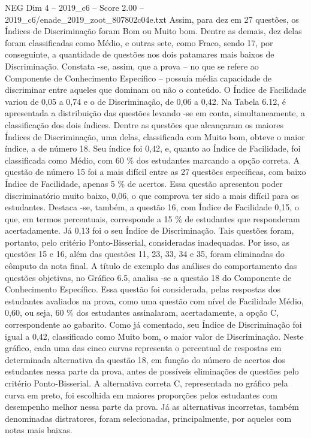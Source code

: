 \begin{textsample}{NEG Dim 4 – 2019\_c6 – Score 2.00 – 2019\_c6/enade\_2019\_zoot\_807802c04e.txt}
Assim, para dez em 27 questões, os Índices de Discriminação foram Bom ou Muito bom.
Dentre as demais, dez delas foram classificadas como Médio, e outras sete, como Fraco, sendo 17, por conseguinte, a quantidade de questões nos dois patamares mais baixos de Discriminação.
Constata -se, assim, que a prova – no que se refere ao Componente de Conhecimento Específico – possuía média capacidade de discriminar entre aqueles que dominam ou não o conteúdo.
O Índice de Facilidade variou de 0,05 a 0,74 e o de Discriminação, de 0,06 a 0,42.
Na Tabela 6.12, é apresentada a distribuição das questões levando -se em conta, simultaneamente, a classificação dos dois índices.
Dentre as questões que alcançaram os maiores Índices de Discriminação, uma delas, classificada com Muito bom, obteve o maior índice, a de número 18.
Seu índice foi 0,42, e, quanto ao Índice de Facilidade, foi classificada como Médio, com 60 \% dos estudantes marcando a opção correta.
A questão de número 15 foi a mais difícil entre as 27 questões específicas, com baixo Índice de Facilidade, apenas 5 \% de acertos.
Essa questão apresentou poder discriminatório muito baixo, 0,06, o que comprova ter sido a mais difícil para os estudantes.
Destaca -se, também, a questão 16, com Índice de Facilidade 0,15, o que, em termos percentuais, corresponde a 15 \% de estudantes que responderam acertadamente.
Já 0,13 foi o seu Índice de Discriminação.
Tais questões foram, portanto, pelo critério Ponto-Bisserial, consideradas inadequadas.
Por isso, as questões 15 e 16, além das questões 11, 23, 33, 34 e 35, foram eliminadas do cômputo da nota final.
A título de exemplo das análises do comportamento das questões objetivas, no Gráfico 6.5, analisa -se a questão 18 do Componente de Conhecimento Específico.
Essa questão foi considerada, pelas respostas dos estudantes avaliados na prova, como uma questão com nível de Facilidade Médio, 0,60, ou seja, 60 \% dos estudantes assinalaram, acertadamente, a opção C, correspondente ao gabarito.
Como já comentado, seu Índice de Discriminação foi igual a 0,42, classificado como Muito bom, o maior valor de Discriminação.
Neste gráfico, cada uma das cinco curvas representa o percentual de respostas em determinada alternativa da questão 18, em função do número de acertos dos estudantes nessa parte da prova, antes de possíveis eliminações de questões pelo critério Ponto-Bisserial.
A alternativa correta C, representada no gráfico pela curva em preto, foi escolhida em maiores proporções pelos estudantes com desempenho melhor nessa parte da prova.
Já as alternativas incorretas, também denominadas distratores, foram selecionadas, principalmente, por aqueles com notas mais baixas.

\end{textsample}
